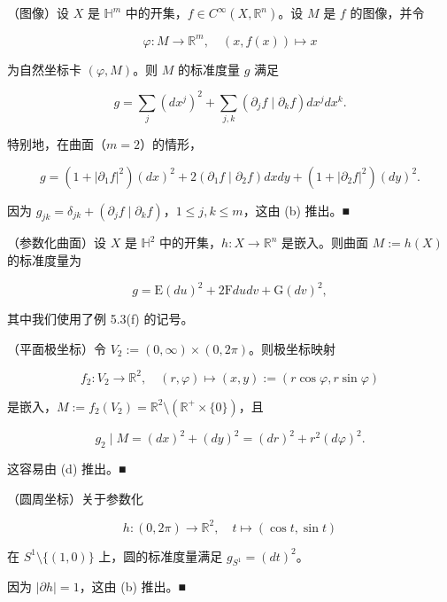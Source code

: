 \begin{example}
\begin{items}
\item

（图像）设 $ X $ 是 $ \mathbb{H}^{m} $ 中的开集，$ f \in C^{\infty}(X, \mathbb{R}^{n}) $。设 $ M $ 是 $ f $ 的图像，并令

\[
\varphi: M \to \mathbb{R}^{m} , \quad (x, f(x)) \mapsto x
\]

为自然坐标卡 $ (\varphi, M) $。则 $ M $ 的标准度量 $ g $ 满足

\[
g = \sum_{j} (dx^{j})^{2} + \sum_{j,k} (\partial_{j}f \mid \partial_{k}f) dx^{j} dx^{k} .
\]

特别地，在曲面（$ m = 2 $）的情形，

\[
g = (1 + |\partial_{1}f|^{2})(dx)^{2} + 2(\partial_{1}f \mid \partial_{2}f) dxdy + (1 + |\partial_{2}f|^{2})(dy)^{2} .
\]

\proofhead
因为 $ g_{jk} = \delta_{jk} + (\partial_{j}f \mid \partial_{k}f) $，$ 1 \le j, k \le m $，这由 (b) 推出。\nobreak\hspace{0.35em}■
\item

（参数化曲面）设 $ X $ 是 $ \mathbb{H}^{2} $ 中的开集，$ h: X \to \mathbb{R}^{n} $ 是嵌入。则曲面 $ M := h(X) $ 的标准度量为

\[
g = \mathrm{E}(du)^{2} + 2\mathrm{F} dudv + \mathrm{G}(dv)^{2} ,
\]

其中我们使用了例 5.3(f) 的记号。

\item

（平面极坐标）令 $ V_{2} := (0, \infty) \times (0, 2\pi) $。则极坐标映射

\[
f_{2}: V_{2} \to \mathbb{R}^{2} , \quad (r, \varphi) \mapsto (x, y) := (r \cos \varphi, r \sin \varphi)
\]

是嵌入，$ M := f_{2}(V_{2}) = \mathbb{R}^{2} \setminus (\mathbb{R}^{+} \times \{0\}) $，且

\[
g_{2} \mid M = (dx)^{2} + (dy)^{2} = (dr)^{2} + r^{2}(d\varphi)^{2} .
\]

\proofhead
这容易由 (d) 推出。\nobreak\hspace{0.35em}■
\item

（圆周坐标）关于参数化

\[
h: (0, 2\pi) \to \mathbb{R}^{2} , \quad t \mapsto (\cos t, \sin t)
\]

在 $ S^{1} \setminus \{(1, 0)\} $ 上，圆的标准度量满足 $ g_{S^{1}} = (dt)^{2} $。

\proofhead
因为 $ |\partial h| = 1 $，这由 (b) 推出。\nobreak\hspace{0.35em}■
\item


\end{items}
\end{example}

